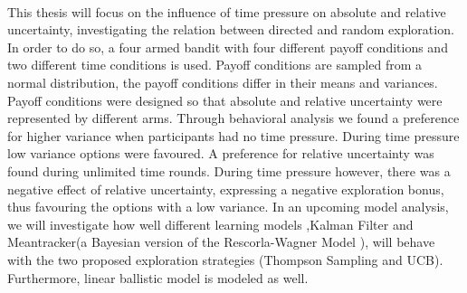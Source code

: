 \\
This thesis will focus on the influence of time pressure on absolute and relative uncertainty, investigating the relation between directed and random exploration. In order to do so, a four armed bandit with four different payoff conditions and two different time conditions is used. Payoff conditions are sampled from a normal distribution, the payoff conditions differ in their means and variances. Payoff conditions were designed so that absolute and relative uncertainty were represented by different arms.  
Through behavioral analysis we found a preference for higher variance when participants had no time pressure. During time pressure low variance options were favoured. A preference for relative uncertainty was found during unlimited time rounds. During time pressure however, there was a negative effect of relative uncertainty, expressing a negative exploration bonus, thus favouring the options with a low variance. 
In an upcoming model analysis, we will investigate how well different learning models ,Kalman Filter and Meantracker(a Bayesian version of the Rescorla-Wagner Model \citep{gershman2015unifying}), will behave with the two proposed exploration strategies (Thompson Sampling and UCB). Furthermore, linear ballistic model is modeled as well. 
